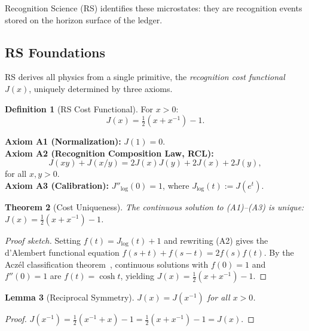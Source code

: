 \documentclass[12pt,a4paper]{article}
\newtheorem{theorem}{Theorem}[section]
\newtheorem{lemma}[theorem]{Lemma}
\theoremstyle{definition}
\newtheorem{definition}[theorem]{Definition}
\theoremstyle{remark}
\begin{document}
Recognition Science (RS) identifies these microstates:
they are recognition events stored on the horizon surface of
the ledger.

\subsection{RS Foundations}

RS derives all physics from a single primitive, the
\emph{recognition cost functional} $J(x)$, uniquely determined
by three axioms.

\begin{definition}[RS Cost Functional]
For $x > 0$:
\begin{equation}
  J(x) = \tfrac{1}{2}(x + x^{-1}) - 1.
  \label{eq:cost}
\end{equation}
\end{definition}

\noindent\textbf{Axiom A1 (Normalization):} $J(1) = 0$.\\
\textbf{Axiom A2 (Recognition Composition Law, RCL):}
\begin{equation}
  J(xy) + J(x/y) = 2J(x)J(y) + 2J(x) + 2J(y),
  \label{eq:RCL}
\end{equation}
for all $x, y > 0$.\\
\textbf{Axiom A3 (Calibration):} $J''_{\log}(0) = 1$, where
$J_{\log}(t) := J(e^t)$.

\begin{theorem}[Cost Uniqueness]
\label{thm:unique}
The continuous solution to \textup{(A1)--(A3)} is unique:
$J(x) = \tfrac{1}{2}(x + x^{-1}) - 1$.
\end{theorem}

\begin{proof}[Proof sketch]
Setting $f(t) = J_{\log}(t) + 1$ and rewriting \textup{(A2)} gives
the d'Alembert functional equation $f(s+t) + f(s-t) = 2f(s)f(t)$.
By the Acz\'el classification theorem~\cite{Aczel1966}, continuous
solutions with $f(0) = 1$ and $f''(0) = 1$ are $f(t) = \cosh t$,
yielding $J(x) = \tfrac{1}{2}(x + x^{-1}) - 1$.
\end{proof}

\begin{lemma}[Reciprocal Symmetry]
\label{lem:reciprocal}
$J(x) = J(x^{-1})$ for all $x > 0$.
\end{lemma}

\begin{proof}
$J(x^{-1}) = \tfrac{1}{2}(x^{-1} + x) - 1
= \tfrac{1}{2}(x + x^{-1}) - 1 = J(x)$.
\end{proof}
\end{document}
